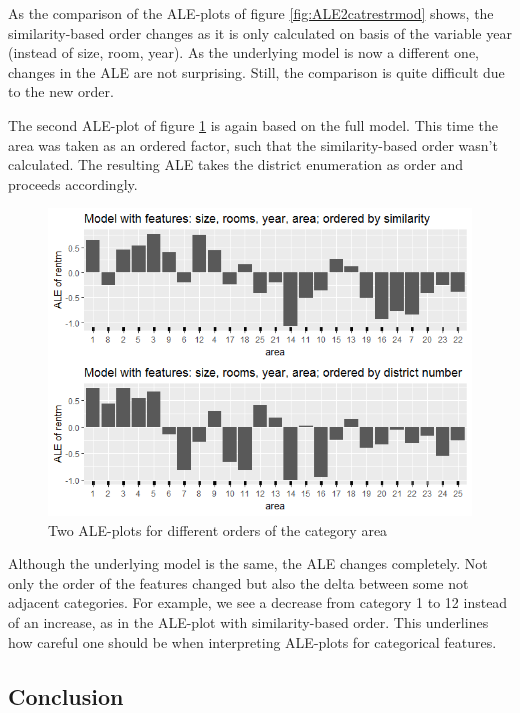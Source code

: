 \documentclass[]{krantz}
\begin{document}
As the comparison of the ALE-plots of figure \ref{fig:ALE2catrestrmod}
shows, the similarity-based order changes as it is only calculated on
basis of the variable year (instead of size, room, year). As the
underlying model is now a different one, changes in the ALE are not
surprising. Still, the comparison is quite difficult due to the new
order.

The second ALE-plot of figure \ref{fig:ALE2catdifford} is again based on
the full model. This time the area was taken as an ordered factor, such
that the similarity-based order wasn't calculated. The resulting ALE
takes the district enumeration as order and proceeds accordingly.

\begin{figure}
\includegraphics[width=1\linewidth]{images/ALE_2_cat_different_orders_} \caption{Two ALE-plots for different orders of the category
area}\label{fig:ALE2catdifford}
\end{figure}




Although the underlying model is the same, the ALE changes completely.
Not only the order of the features changed but also the delta between
some not adjacent categories. For example, we see a decrease from
category 1 to 12 instead of an increase, as in the ALE-plot with
similarity-based order. This underlines how careful one should be when
interpreting ALE-plots for categorical features.

\subsection{Conclusion}\label{conclusion-1}
\end{document}
